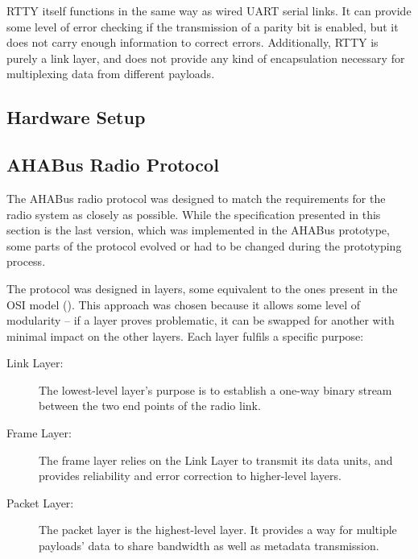RTTY itself functions in the same way as wired UART serial links. It can provide
some level of error checking if the transmission of a parity bit is enabled, but
it does not carry enough information to correct errors. Additionally, RTTY is
purely a link layer, and does not provide any kind of encapsulation necessary
for multiplexing data from different payloads.

\subsection{Hardware Setup}

\subsection{AHABus Radio Protocol}

The AHABus radio protocol was designed to match the requirements for the radio
system as closely as possible. While the specification presented in this section
is the last version, which was implemented in the AHABus prototype, some parts
of the protocol evolved or had to be changed during the prototyping process.

The protocol was designed in layers, some equivalent to the ones present in the
OSI model (\cite{Stallings1987}). This approach was chosen because it allows
some level of modularity – if a layer proves problematic, it can be swapped
for another with minimal impact on the other layers. Each layer fulfils a
specific purpose:


\begin{description}
\item[Link Layer:] The lowest-level layer's purpose is to establish a one-way
binary stream between the two end points of the radio link.

\item[Frame Layer:] The frame layer relies on the Link Layer to transmit its
data units, and provides reliability and error correction to higher-level 
layers.

\item[Packet Layer:] The packet layer is the highest-level layer. It provides
a way for multiple payloads' data to share bandwidth as well as metadata
transmission.
\end{description}

